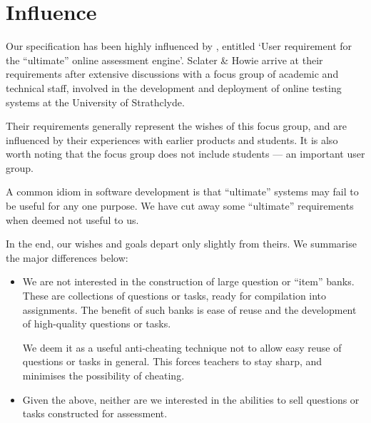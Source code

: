 
\section{Influence}

Our specification has been highly influenced by \cite{sclater-howie-2003},
entitled `User requirement for the ``ultimate'' online assessment engine'.
Sclater \& Howie arrive at their requirements after extensive discussions with
a focus group of academic and technical staff, involved in the development and
deployment of online testing systems at the University of Strathclyde.

Their requirements generally represent the wishes of this focus group, and are
influenced by their experiences with earlier products and students.  It is also
worth noting that the focus group does not include students --- an important
user group.

A common idiom in software development is that ``ultimate'' systems may fail to
be useful for any one purpose. We have cut away some ``ultimate'' requirements
when deemed not useful to us.

In the end, our wishes and goals depart only slightly from theirs. We summarise
the major differences below:

\begin{itemize}

\item We are not interested in the construction of large question or ``item''
banks\cite{conole-warburton-2005}. These are collections of questions or
tasks, ready for compilation into assignments. The benefit of such banks is
ease of reuse and the development of high-quality questions or tasks.

We deem it as a useful anti-cheating technique not to allow easy reuse of
questions or tasks in general. This forces teachers to stay sharp, and
minimises the possibility of cheating.

\item Given the above, neither are we interested in the abilities to sell
questions or tasks constructed for assessment.

\end{itemize}

